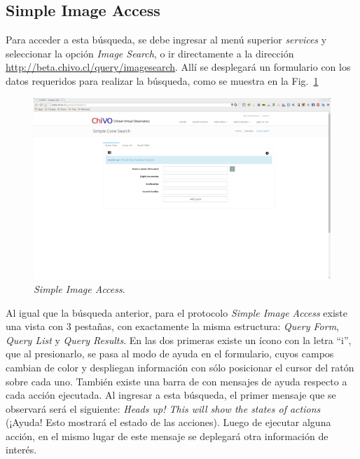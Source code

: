 \subsection{Simple Image Access}

Para acceder a esta búsqueda, se debe ingresar al menú superior
\emph{services} y seleccionar la opción \emph{Image Search}, o ir
directamente a la dirección
\url{http://beta.chivo.cl/query/imagesearch}. Allí se desplegará un
formulario con los datos requeridos para realizar la búsqueda, como se
muestra en la Fig.~\ref{img:sia}

\begin{figure}[ht!]
    \begin{center}
	\includegraphics[scale=.2]{img/sia}
    \end{center}
    \caption{\emph{Simple Image Access}.}\label{img:sia}
\end{figure}

Al igual que la búsqueda anterior, para el protocolo \emph{Simple
Image Access} existe una vista con 3 pestañas, con exactamente la
misma estructura: \emph{Query Form}, \emph{Query List} y \emph{Query
Results}. En las dos primeras existe un ícono con la letra ``i'', que
al presionarlo, se pasa al modo de ayuda en el formulario, cuyos
campos cambian de color y despliegan información con sólo posicionar
el cursor del ratón sobre cada uno. También existe una barra de con
mensajes de ayuda respecto a cada acción ejecutada. Al ingresar a esta
búsqueda, el primer mensaje que se observará será el siguiente:
\emph{Heads up! This will show the states of actions} (¡Ayuda! Esto
mostrará el estado de las acciones). Luego de ejecutar alguna acción,
en el mismo lugar de este mensaje se deplegará otra información de
interés.

